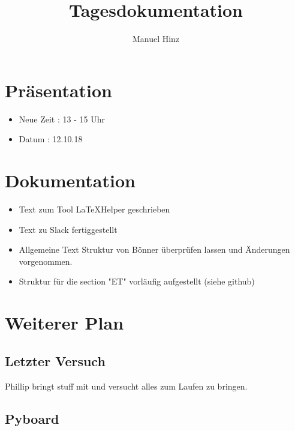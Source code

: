 \documentclass{article}
\author{Manuel Hinz}
\title{Tagesdokumentation}
\begin{document}
\maketitle

\section{Präsentation}

\begin{itemize}

\item Neue Zeit : 13 - 15 Uhr

\item Datum : 12.10.18

\end{itemize}

\section{Dokumentation}

\begin{itemize}

\item Text zum Tool LaTeXHelper geschrieben

\item Text zu Slack fertiggestellt 

\item Allgemeine Text Struktur von Bönner überprüfen lassen und Änderungen vorgenommen.

\item Struktur für die section "ET" vorläufig aufgestellt (siehe github)

\end{itemize}

\section{Weiterer Plan}

\subsection{Letzter Versuch}

Phillip bringt stuff mit und versucht alles zum Laufen zu bringen.

\subsection{Pyboard}
\end{document}
